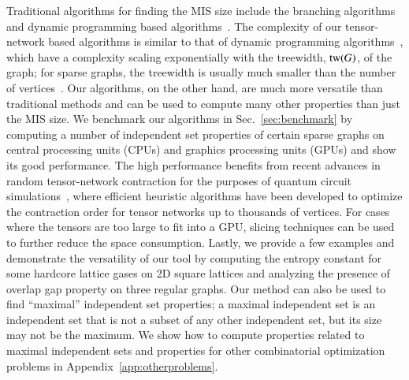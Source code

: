 \documentclass[onefignum, onetabnum]{siamart190516}
\newcommand{\<}{\langle}
\renewcommand{\>}{\rangle}
\newcommand{\Sec}[1]{Sec.~\ref{#1}}
\newcommand{\App}[1]{Appendix~\ref{#1}}
\newcounter{example}
\begin{document}
Traditional algorithms for finding the MIS size include the branching algorithms~\cite{Tarjan1977, Robson1986} and dynamic programming based algorithms~\cite{Courcelle1990, Fomin2013}.
The complexity of our tensor-network based algorithms is similar to that of dynamic programming algorithms~\cite{Courcelle1990, Fomin2013}, which have a complexity scaling exponentially with the treewidth, ${\rm tw}(G)$, of the graph;
for sparse graphs, the treewidth is usually much smaller than the number of vertices~\cite{Fomin2006}. Our algorithms, on the other hand, are much more versatile than traditional methods and can be used to compute many other properties than just the MIS size.
We benchmark our algorithms in \Sec{sec:benchmark} by computing a number of independent set properties of certain sparse graphs on central processing units (CPUs) and graphics processing units (GPUs) and show its good performance.
The high performance benefits from recent advances in random tensor-network contraction for the purposes of quantum circuit simulations~\cite{Gray2021, Pan2021, Kalachev2021},
where efficient heuristic algorithms have been developed to optimize the contraction order for tensor networks up to thousands of vertices.
For cases where the tensors are too large to fit into a GPU, slicing techniques can be used to further reduce the space consumption.
Lastly, we provide a few examples and demonstrate the versatility of our tool by computing the entropy constant for some hardcore lattice gases on 2D square lattices and analyzing the presence of overlap gap property on three regular graphs.
Our method can also be used to find ``maximal'' independent set properties; 
a maximal independent set is an independent set that is not a subset of any other independent set, but its size may not be the maximum. 
We show how to compute properties related to maximal independent sets and properties for other combinatorial optimization problems in \App{app:otherproblems}.
\end{document}
